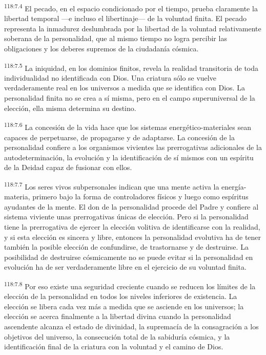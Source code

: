 \documentclass[twoside, 11pt]{book}
\begin{document}
\par
\textsuperscript{118:7.4} El pecado, en el espacio condicionado por el tiempo, prueba claramente la libertad temporal ---e incluso el libertinaje--- de la voluntad finita. El pecado representa la inmadurez deslumbrada por la libertad de la voluntad relativamente soberana de la personalidad, que al mismo tiempo no logra percibir las obligaciones y los deberes supremos de la ciudadanía cósmica.

\par
\textsuperscript{118:7.5} La iniquidad, en los dominios finitos, revela la realidad transitoria de toda individualidad no identificada con Dios. Una criatura sólo se vuelve verdaderamente real en los universos a medida que se identifica con Dios. La personalidad finita no se crea a sí misma, pero en el campo superuniversal de la elección, ella misma determina su destino.

\par
\textsuperscript{118:7.6} La concesión de la vida hace que los sistemas energético-materiales sean capaces de perpetuarse, de propagarse y de adaptarse. La concesión de la personalidad confiere a los organismos vivientes las prerrogativas adicionales de la autodeterminación, la evolución y la identificación de sí mismos con un espíritu de la Deidad capaz de fusionar con ellos.

\par
\textsuperscript{118:7.7} Los seres vivos subpersonales indican que una mente activa la energía-materia, primero bajo la forma de controladores físicos y luego como espíritus ayudantes de la mente. El don de la personalidad procede del Padre y confiere al sistema viviente unas prerrogativas únicas de elección. Pero si la personalidad tiene la prerrogativa de ejercer la elección volitiva de identificarse con la realidad, y si esta elección es sincera y libre, entonces la personalidad evolutiva ha de tener también la posible elección de confundirse, de trastornarse y de destruirse. La posibilidad de destruirse cósmicamente no se puede evitar si la personalidad en evolución ha de ser verdaderamente libre en el ejercicio de su voluntad finita.

\par
\textsuperscript{118:7.8} Por eso existe una seguridad creciente cuando se reducen los límites de la elección de la personalidad en todos los niveles inferiores de existencia. La elección se libera cada vez más a medida que se asciende en los universos; la elección se acerca finalmente a la libertad divina cuando la personalidad ascendente alcanza el estado de divinidad, la supremacía de la consagración a los objetivos del universo, la consecución total de la sabiduría cósmica, y la identificación final de la criatura con la voluntad y el camino de Dios.
\end{document}
